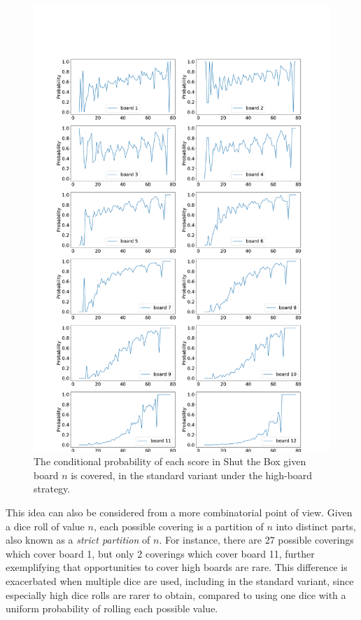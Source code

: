 \begin{figure}
    \centering
    \includegraphics[width=\textwidth]{images/ShutTheBox/stb12_2d6_score_given_board_12.pdf}
    \caption{The conditional probability of each score in Shut the Box given board $n$ is covered, in the standard variant under the high-board strategy.}
\label{cs1:stb12_2d6_cond_prob}
\end{figure}

This idea can also be considered from a more combinatorial point of view. Given a dice roll of value $n$, each possible covering is a partition of $n$ into distinct parts, also known as a \emph{strict partition} of $n$. For instance, there are 27 possible coverings which cover board 1, but only 2 coverings which cover board 11, further exemplifying that opportunities to cover high boards are rare. This difference is exacerbated when multiple dice are used, including in the standard variant, since especially high dice rolls are rarer to obtain, compared to using one dice with a uniform probability of rolling each possible value.

